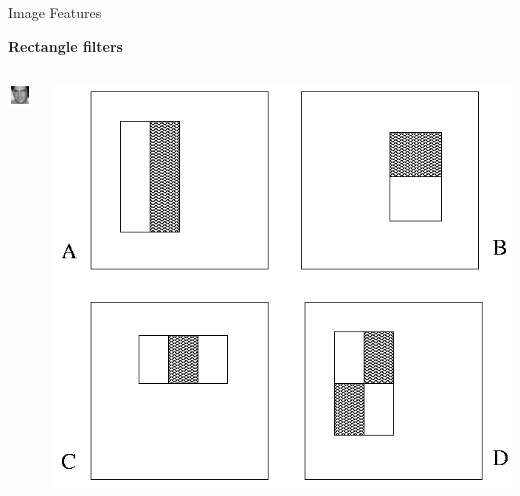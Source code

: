 \documentclass[compress]{beamer}
\begin{document}
\begin{frame}{Image Features}

    {\bf Rectangle filters}

    \begin{columns}
        \begin{column}{0.3\linewidth}
            \begin{center}
                \includegraphics[width=0.8\linewidth]{sample-face}
            \end{center}

        \end{column}
        \begin{column}{0.7\linewidth}
            \begin{center}
                \includegraphics[width=0.8\linewidth]{rectangle-filters}
            \end{center}
        \end{column}
    \end{columns}


\end{frame}
\end{document}
